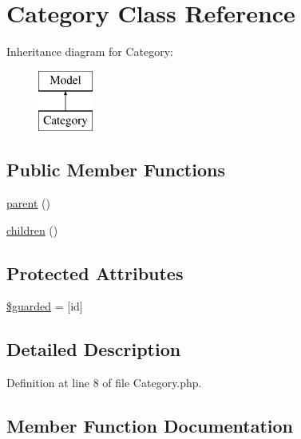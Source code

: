 \hypertarget{class_responsive_1_1_category}{}\section{Category Class Reference}
\label{class_responsive_1_1_category}
Inheritance diagram for Category\+:\begin{figure}[H]
\begin{center}
\leavevmode
\includegraphics[height=2.000000cm]{class_responsive_1_1_category}
\end{center}
\end{figure}
\subsection*{Public Member Functions}
\begin{DoxyCompactItemize}
\item 
\mbox{\hyperlink{class_responsive_1_1_category_a3249177749c4f2274ed77044179f7f6b}{parent}} ()
\item 
\mbox{\hyperlink{class_responsive_1_1_category_a96b7b4a7058b19acb14d9f844c1e4736}{children}} ()
\end{DoxyCompactItemize}
\subsection*{Protected Attributes}
\begin{DoxyCompactItemize}
\item 
\mbox{\hyperlink{class_responsive_1_1_category_a5758640ec23bdc1a6850649763244e86}{\$guarded}} = \mbox{[}\textquotesingle{}id\textquotesingle{}\mbox{]}
\end{DoxyCompactItemize}


\subsection{Detailed Description}


Definition at line 8 of file Category.\+php.



\subsection{Member Function Documentation}
\mbox{\label{class_responsive_1_1_category_a96b7b4a7058b19acb14d9f844c1e4736}} 
